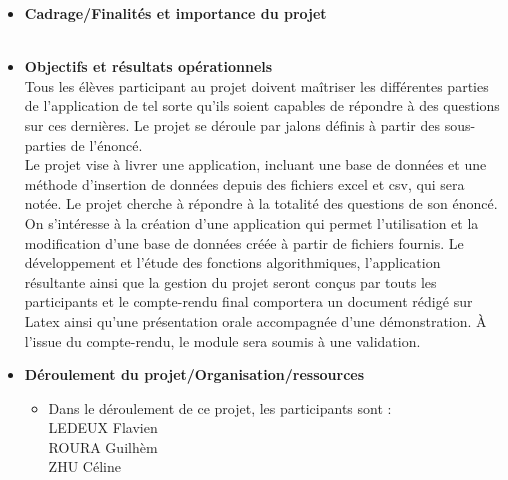             \begin{itemize}
                \item {\textbf {Cadrage/Finalités et importance du projet}} \\
               \\
                
                \item {\textbf {Objectifs et résultats opérationnels}}\\
                

Tous les élèves participant au projet doivent maîtriser les différentes parties de l’application de tel sorte qu’ils soient capables de répondre à des questions sur ces dernières. Le projet se déroule par jalons définis à partir des sous-parties de l’énoncé.\\

Le projet vise à livrer une application, incluant une base de données et une méthode d’insertion de données depuis des fichiers excel et csv, qui sera notée.
Le projet cherche à répondre à la totalité des questions de son énoncé. On s’intéresse à la création d’une application qui permet l’utilisation et la modification d’une base de données créée à partir de fichiers fournis. Le développement et l’étude des fonctions algorithmiques, l’application résultante ainsi que la gestion du projet seront conçus par touts les participants et le compte-rendu final comportera un document rédigé sur Latex ainsi qu’une présentation orale accompagnée d’une démonstration. À l’issue du compte-rendu, le module sera soumis à une validation.  
\\


                
                \item {\textbf {Déroulement du projet/Organisation/ressources}}\\
                \begin{itemize}
                    \item Dans le déroulement de ce projet, les participants sont :\\
                    
                    LEDEUX Flavien\\
                    ROURA Guilhèm\\
                    ZHU Céline\\
                   

\end{itemize}
\end{itemize}
